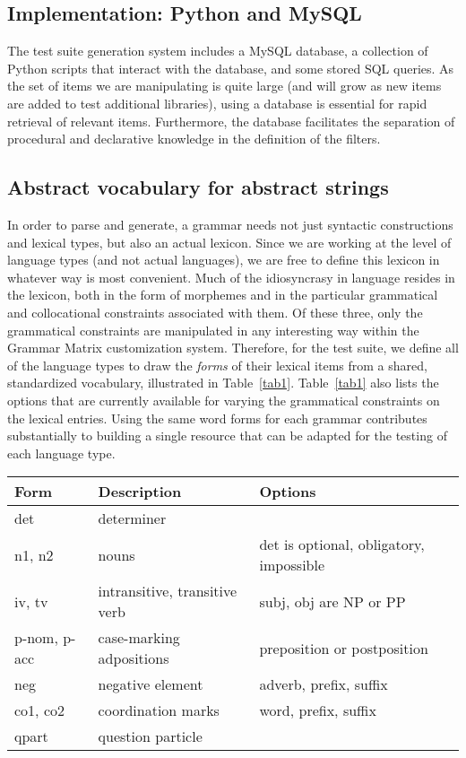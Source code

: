 \documentclass[11pt]{article}
\begin{document}
\subsection{Implementation: Python and MySQL}

The test suite generation system includes a MySQL database, a collection
of Python scripts that interact with the database, and some stored
SQL queries.  As the set of items we are manipulating is quite large
(and will grow as new items are added to test additional libraries),
using a database is essential for rapid retrieval of relevant items.
Furthermore, the database facilitates the separation of procedural
and declarative knowledge in the definition of the filters.

\subsection{Abstract vocabulary for abstract strings}

In order to parse and generate, a grammar needs not just syntactic
constructions and lexical types, but also an actual lexicon.  Since we
are working at the level of language types (and not actual languages),
we are free to define this lexicon in whatever way is most convenient.
Much of the idiosyncrasy in language resides in the lexicon, both in
the form of morphemes and in the particular grammatical and
collocational constraints associated with them.  Of these three, only
the grammatical constraints are manipulated in any interesting way
within the Grammar Matrix customization system.  Therefore, for the
test suite, we define all of the language types to draw the {\it
forms} of their lexical items from a shared, standardized vocabulary,
illustrated in Table~\ref{tab1}.  Table~\ref{tab1} also lists the
options that are currently available for varying the grammatical
constraints on the lexical entries.  Using the same word forms for
each grammar contributes substantially to building a single resource
that can be adapted for the testing of each language type.

\begin{table*}[ht]
\begin{center}
\begin{tabular}{|l|l|l|}
\hline
Form & Description & Options \\ \hline \hline
det & determiner & \\ 
n1, n2 & nouns & det is optional, obligatory, impossible\\
iv, tv & intransitive, transitive verb & subj, obj are NP or PP\\
p-nom, p-acc & case-marking adpositions & preposition or postposition\\
neg & negative element & adverb, prefix, suffix\\
co1, co2 & coordination marks & word, prefix, suffix\\
qpart & question particle & \\
\hline
\end{tabular}
\end{center}
\caption{Standardized lexicon}
\label{tab1}
\end{table*}
\end{document}
